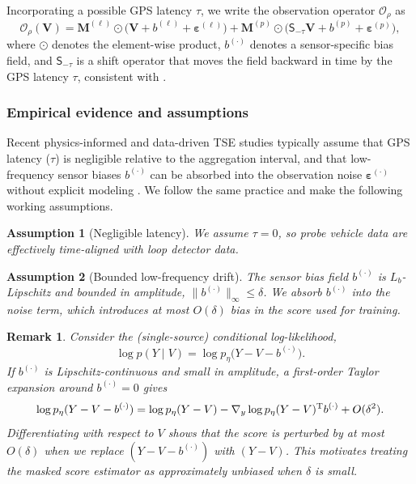 \documentclass[a4paper,fleqn]{cas-sc}
\newtheorem{assumption}{Assumption}
\newtheorem{remark}{Remark}
\numberwithin{equation}{section}
\begin{document}
Incorporating a possible GPS latency $\tau$, we write the observation operator $\mathcal O_\rho$ as
\begin{equation}
    \mathcal O_\rho(\mathbf V)=
    \mathbf M^{(\ell)} \odot \bigl(\mathbf V + b^{(\ell)} + \boldsymbol\varepsilon^{(\ell)}\bigr)
    +
    \mathbf M^{(p)} \odot \bigl(\mathsf S_{-\tau}\mathbf V + b^{(p)} + \boldsymbol\varepsilon^{(p)}\bigr),
    \label{eq:obs-general}
\end{equation}
where $\odot$ denotes the element-wise product, $b^{(\cdot)}$ denotes a sensor-specific bias field, and $\mathsf S_{-\tau}$ is a shift operator that moves the field backward in time by the GPS latency $\tau$, consistent with \citet{kim2014comparing}.

\subsubsection{Empirical evidence and assumptions}
Recent physics-informed and data-driven TSE studies typically assume that GPS latency ($\tau$) is negligible relative to the aggregation interval, and that low-frequency sensor biases $b^{(\cdot)}$ can be absorbed into the observation noise $\boldsymbol\varepsilon^{(\cdot)}$ without explicit modeling \citep{shi2021physics,wu2024traffic,wang2023low}. We follow the same practice and make the following working assumptions.

\begin{assumption}[Negligible latency]\label{asm:latency} 
We assume $\tau=0$, so probe vehicle data are effectively time-aligned with loop detector data.
\end{assumption} 

\begin{assumption}[Bounded low-frequency drift]\label{asm:drift}
The sensor bias field $b^{(\cdot)}$ is $L_b$-Lipschitz and bounded in amplitude, $\|b^{(\cdot)}\|_\infty \le \delta$. We absorb $b^{(\cdot)}$ into the noise term, which introduces at most $O(\delta)$ bias in the score used for training.
\end{assumption}

\begin{remark}
Consider the (single-source) conditional log-likelihood,
\begin{equation}
    \log p(Y\mid  V)=\log p_\eta\bigl(Y-V-b^{(\cdot)}\bigr).
\end{equation}
If $b^{(\cdot)}$ is Lipschitz-continuous and small in amplitude, a first-order Taylor expansion around $b^{(\cdot)}=0$ gives
\begin{equation}
    \log p_\eta(Y-V-b^{(\cdot)})=\log p_\eta(Y-V) - \nabla_y \log p_\eta(Y-V)^{\rm T} b^{(\cdot)} + O(\delta^2).
\end{equation}
Differentiating with respect to $V$ shows that the score is perturbed by at most $O(\delta)$ when we replace $(Y-V-b^{(\cdot)})$ with $(Y-V)$. This motivates treating the masked score estimator as approximately unbiased when $\delta$ is small.
\end{remark}
\end{document}
